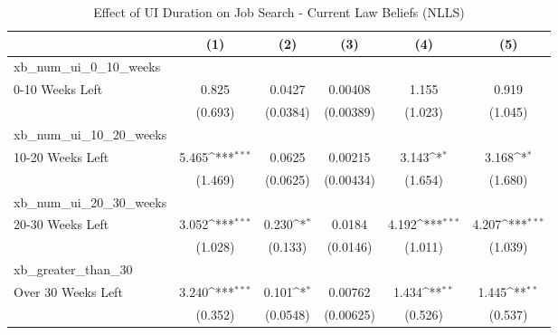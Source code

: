 \begin{table}[htbp]\centering
\def\sym#1{\ifmmode^{#1}\else\(^{#1}\)\fi}
\caption{Effect of UI Duration on Job Search - Current Law Beliefs (NLLS) \label{tab:sophregs}}
\begin{tabular}{l*{5}{c}}
\hline\hline
                    &\multicolumn{1}{c}{(1)}         &\multicolumn{1}{c}{(2)}         &\multicolumn{1}{c}{(3)}         &\multicolumn{1}{c}{(4)}         &\multicolumn{1}{c}{(5)}         \\
\hline
xb\_num\_ui\_0\_10\_weeks&                     &                     &                     &                     &                     \\
0-10 Weeks Left     &       0.825         &      0.0427         &     0.00408         &       1.155         &       0.919         \\
                    &     (0.693)         &    (0.0384)         &   (0.00389)         &     (1.023)         &     (1.045)         \\
\hline
xb\_num\_ui\_10\_20\_weeks&                     &                     &                     &                     &                     \\
10-20 Weeks Left    &       5.465\sym{***}&      0.0625         &     0.00215         &       3.143\sym{*}  &       3.168\sym{*}  \\
                    &     (1.469)         &    (0.0625)         &   (0.00434)         &     (1.654)         &     (1.680)         \\
\hline
xb\_num\_ui\_20\_30\_weeks&                     &                     &                     &                     &                     \\
20-30 Weeks Left    &       3.052\sym{***}&       0.230\sym{*}  &      0.0184         &       4.192\sym{***}&       4.207\sym{***}\\
                    &     (1.028)         &     (0.133)         &    (0.0146)         &     (1.011)         &     (1.039)         \\
\hline
xb\_greater\_than\_30  &                     &                     &                     &                     &                     \\
Over 30 Weeks Left  &       3.240\sym{***}&       0.101\sym{*}  &     0.00762         &       1.434\sym{**} &       1.445\sym{**} \\
                    &     (0.352)         &    (0.0548)         &   (0.00625)         &     (0.526)         &     (0.537)         \\

\end{tabular}
\end{table}
